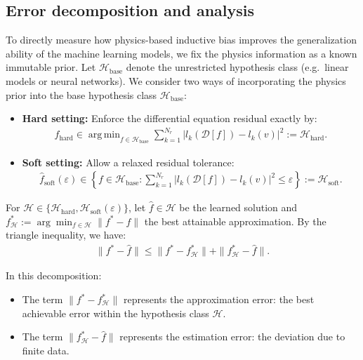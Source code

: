 \documentclass{article}
\DeclareMathOperator*{\argmin}{arg\,min}
\theoremstyle{plain}
\theoremstyle{definition}
\theoremstyle{remark}
\begin{document}
\subsection{Error decomposition and analysis}
\label{app:analysis setting}
To directly measure how physics-based inductive bias improves the generalization ability of the machine learning models, we fix the physics information as a known immutable prior. Let $\mathcal{H}_{\text{base}}$ denote the unrestricted hypothesis class (e.g.\ linear models or neural networks). We consider two ways of incorporating the physics prior into the base hypothesis class $\mathcal{H}_{\text{base}}$: 
\begin{itemize}
    \item \textbf{Hard setting:} Enforce the differential equation residual exactly by:
    \begin{align}
        \hat{f}_{\text{hard}} \in \argmin_{f \in \mathcal{H}_{\text{base}}} \sum_{k=1}^{N_r} |l_k(\mathscr{D}[f]) - l_k(v)|^2 := \mathcal{H}_{\text{hard}}.
    \end{align}
    \item \textbf{Soft setting:} Allow a relaxed residual tolerance:
    \begin{align}
        \hat{f}_{\text{soft}}(\varepsilon) \in \left\{f \in \mathcal{H}_{\text{base}} : \sum_{k=1}^{N_r} |l_k(\mathscr{D}[f]) - l_k(v)|^2 \le \varepsilon \right\} := \mathcal{H}_{\text{soft}}.
    \end{align}
\end{itemize}

For $\mathcal{H}\in\{\mathcal{H}_{\text{hard}},\mathcal{H}_{\text{soft}}(\varepsilon)\}$, let $\hat{f}\in\mathcal{H}$ be the learned solution and $f_{\mathcal{H}}^{\ast}:=\arg\min_{f\in\mathcal{H}}\|f^{\ast}-f\|$ the best attainable approximation. By the triangle inequality, we have:
\begin{align}
    \|f^* - \hat{f}\| \le \|f^* - f_{\mathcal{H}}^*\| + \|f_{\mathcal{H}}^* - \hat{f}\|.
\end{align}

In this decomposition:
\begin{itemize}
    \item The term $\|f^* - f_{\mathcal{H}}^*\|$ represents the approximation error: the best achievable error within the hypothesis class $\mathcal{H}$.
    \item The term $\|f_{\mathcal{H}}^* - \hat{f}\|$ represents the estimation error: the deviation due to finite data. 
\end{itemize}
\end{document}
